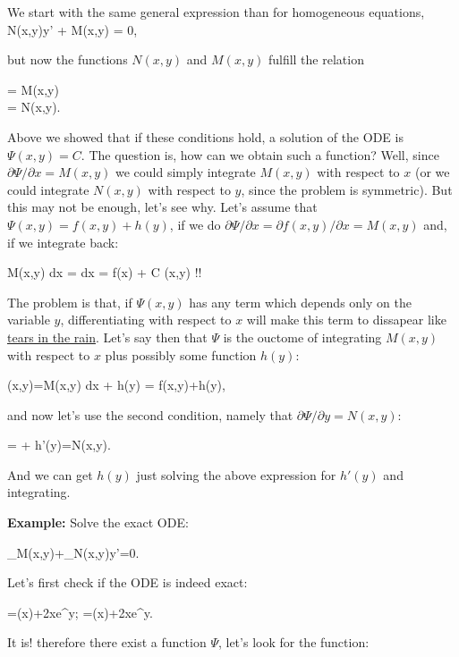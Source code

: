 We start with the same general expression than for homogeneous equations,
\bnn N(x,y)y' + M(x,y) = 0, \enn

but now the functions $N(x,y)$ and $M(x,y)$ fulfill the relation

\bnn 
	= M(x,y) \\
	= N(x,y). 
\enn

Above we showed that if these conditions hold, a solution of the ODE is $\Psi(x,y)=C$. The question is, how
can we obtain such a function? Well, since $\partial \Psi /\partial x= M(x,y)$ we could simply integrate
$M(x,y)$ with respect to $x$ (or we could integrate $N(x,y)$ with respect to $y$, since the problem is
symmetric). But this may not be enough, let's see why. Let's assume that $\Psi(x,y)=f(x,y)+h(y)$, if
we do $\partial \Psi /\partial x= \partial f(x,y)/ \partial x = M(x,y) $ and, if we integrate back:

\bnn
	\int M(x,y) dx = \int {} dx = f(x) + C \neq \Psi(x,y) \quad \mbox{!!}
\enn

The problem is that, if $\Psi(x,y)$ has any term which depends only on the variable $y$, differentiating with respect
to $x$ will make this term to dissapear like \href{https://www.youtube.com/watch?v=NoAzpa1x7jU}{tears in the rain}. Let's say then that $\Psi$ is the ouctome of integrating $M(x,y)$ with respect to $x$ plus possibly some function $h(y)$:

\bnn
	\Psi(x,y)=\int M(x,y) dx + h(y) = f(x,y)+h(y),
\enn

and now let's use the second condition, namely that $\partial \Psi /\partial y= N(x,y)$:

\bnn
	=  + h'(y)=N(x,y).
\enn

And we can get $h(y)$ just solving the above expression for $h'(y)$ and integrating.

{\bf Example:} Solve the exact ODE:

\bnn
	_{M(x,y)}+_{N(x,y)}y'=0.
\enn

Let's first check if the ODE is indeed exact:

\bnn
    	=\cos(x)+2xe^y; \quad {}=\cos(x)+2xe^y.
\enn

It is! therefore there exist a function $\Psi$, let's look for the function:

